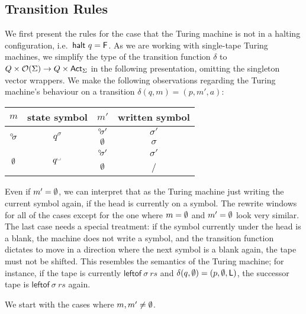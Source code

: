 \subsection{Transition Rules}
We first present the rules for the case that the Turing machine is not in a halting configuration, i.e.\ $\textsf{halt}~q = \mathsf{F}$.
As we are working with single-tape Turing machines, we simplify the type of the transition function $\delta$ to $Q \times \mathcal{O}{(\Sigma)} \rightarrow Q \times \textsf{Act}_\Sigma$ in the following presentation, omitting the singleton vector wrappers. 
We make the following observations regarding the Turing machine's behaviour on a transition $\delta (q, m) = (p, m', a)$:
\begin{center}
  \begin{tabular}{cccc}
    $m$ & state symbol & $m'$ & written symbol \\
    \midrule
    \multirow{2}{*}{$\degree\kern-0.5ex\sigma$} & \multirow{2}{*}{$q^\sigma$} & $\degree\kern-0.5ex\sigma'$ & $\sigma'$ \\
    \cmidrule{3-4}
                                     & & $\emptyset$ & $\sigma$ \\
                                     \midrule
    \multirow{2}{*}{$\emptyset$} & \multirow{2}{*}{$q^\blank$} & $\degree\kern-0.5ex\sigma'$ & $\sigma'$ \\
    \cmidrule{3-4}
                             & & $\emptyset$ & / 
  \end{tabular}
\end{center}
Even if $m' = \emptyset$, we can interpret that as the Turing machine just writing the current symbol again, if the head is currently on a symbol. 
The rewrite windows for all of the cases except for the one where $m = \emptyset$ and $m' = \emptyset$ look very similar. The last case needs a special treatment: if the symbol currently under the head is a blank, the machine does not write a symbol, and the transition function dictates to move in a direction where the next symbol is a blank again, the tape must not be shifted.
This resembles the semantics of the Turing machine; for instance, if the tape is currently $\textsf{leftof}~\sigma~rs$ and $\delta(q, \emptyset) = (p, \emptyset, \textsf{L})$, the successor tape is $\textsf{leftof}~\sigma~rs$ again.

We start with the cases where $m, m' \neq \emptyset$.

